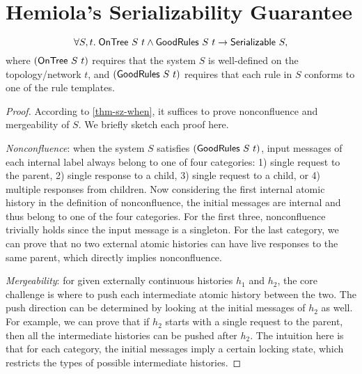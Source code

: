 \documentclass[sigplan,10pt,review,anonymous,screen]{acmart}\settopmatter{printfolios=true,printccs=false,printacmref=false}
\begin{document}
\section{Hemiola's Serializability Guarantee}
\label{sec-appx-sz-guarantee}

\renewcommand*{\proofname}{Proof Sketch}
\begin{theorem}
  \begin{displaymath}
    \forall S, t.\; \mathsf{OnTree}\ S\ t \land \mathsf{GoodRules}\ S\ t \to \mathsf{Serializable}\ S,
  \end{displaymath}
  where $(\mathsf{OnTree}\ S\ t)$ requires that the system $S$ is well-defined on the
  topology/network $t$, and $(\mathsf{GoodRules}\ S\ t)$ requires that each rule in $S$
  conforms to one of the rule templates.
\end{theorem}
\begin{proof}
  According to \autoref{thm-sz-when}, it suffices to prove nonconfluence and mergeability of $S$. We briefly sketch each proof here.

  \emph{Nonconfluence}: when the system $S$ satisfies $(\mathsf{GoodRules}\ S\ t)$, input messages of each internal label always belong to one of four categories:
  1) single request to the parent, 2) single response to a child, 3) single request to a child, or 4) multiple responses from children.
  Now considering the first internal atomic history in the definition of nonconfluence, the initial messages are internal and thus belong to one of the four categories.
  For the first three, nonconfluence trivially holds since the input message is a singleton.
  For the last category, we can prove that no two external atomic histories can have live responses to the same parent, which directly implies nonconfluence.

  \emph{Mergeability}: for given externally continuous histories $h_1$ and $h_2$, the core challenge is where to push each intermediate atomic history between the two.
  The push direction can be determined by looking at the initial messages of $h_2$ as well.
  For example, we can prove that if $h_2$ starts with a single request to the parent, then all the intermediate histories can be pushed after $h_2$.
  The intuition here is that for each category, the initial messages imply a certain locking state, which restricts the types of possible intermediate histories.
\end{proof}
\renewcommand*{\proofname}{Proof}
\end{document}
